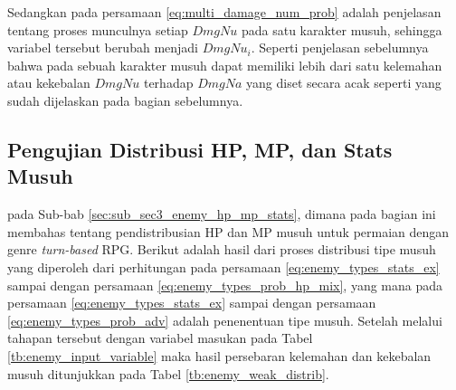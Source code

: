 Sedangkan pada persamaan \ref{eq:multi_damage_num_prob} adalah penjelasan tentang proses munculnya setiap $DmgNu$ pada satu karakter musuh, sehingga variabel tersebut berubah menjadi $DmgNu_{i}$. Seperti penjelasan sebelumnya bahwa pada sebuah karakter musuh dapat memiliki lebih dari satu kelemahan atau kekebalan $DmgNu$ terhadap $DmgNa$ yang diset secara acak seperti yang sudah dijelaskan pada bagian sebelumnya. 
\vspace{1ex}


\subsection{Pengujian Distribusi HP, MP, dan Stats Musuh}
\label{sec:sub_sec4_eval_dist_enemy_HP_MP_Stats}
\vspace{1ex}

pada Sub-bab \ref{sec:sub_sec3_enemy_hp_mp_stats}, dimana pada bagian ini membahas tentang pendistribusian HP dan MP musuh untuk permaian dengan genre \textit{turn-based} RPG. Berikut adalah hasil dari proses distribusi tipe musuh yang diperoleh dari perhitungan pada persamaan \ref{eq:enemy_types_stats_ex} sampai dengan persamaan \ref{eq:enemy_types_prob_hp_mix}, yang mana pada persamaan \ref{eq:enemy_types_stats_ex} sampai dengan persamaan \ref{eq:enemy_types_prob_adv} adalah penenentuan tipe musuh. Setelah melalui tahapan tersebut dengan variabel masukan pada Tabel \ref{tb:enemy_input_variable} maka hasil persebaran kelemahan dan kekebalan musuh ditunjukkan pada Tabel \ref{tb:enemy_weak_distrib}.
\vspace{-1ex}

